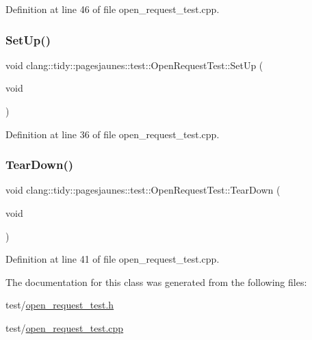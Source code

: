 Definition at line 46 of file open\+\_\+request\+\_\+test.\+cpp.

\mbox{\label{classclang_1_1tidy_1_1pagesjaunes_1_1test_1_1_open_request_test_a45a010812dff31c9170dd04adfda2202}} 
\subsubsection{\texorpdfstring{Set\+Up()}{SetUp()}}
{\footnotesize\ttfamily void clang\+::tidy\+::pagesjaunes\+::test\+::\+Open\+Request\+Test\+::\+Set\+Up (\begin{DoxyParamCaption}\item[{void}]{ }\end{DoxyParamCaption})\hspace{0.3cm}{\ttfamily [virtual]}}



Definition at line 36 of file open\+\_\+request\+\_\+test.\+cpp.

\mbox{\label{classclang_1_1tidy_1_1pagesjaunes_1_1test_1_1_open_request_test_a5c9237258553286289ddc7e71016a60f}} 
\subsubsection{\texorpdfstring{Tear\+Down()}{TearDown()}}
{\footnotesize\ttfamily void clang\+::tidy\+::pagesjaunes\+::test\+::\+Open\+Request\+Test\+::\+Tear\+Down (\begin{DoxyParamCaption}\item[{void}]{ }\end{DoxyParamCaption})\hspace{0.3cm}{\ttfamily [virtual]}}



Definition at line 41 of file open\+\_\+request\+\_\+test.\+cpp.



The documentation for this class was generated from the following files\+:\begin{DoxyCompactItemize}
\item 
test/\hyperlink{open__request__test_8h}{open\+\_\+request\+\_\+test.\+h}\item 
test/\hyperlink{open__request__test_8cpp}{open\+\_\+request\+\_\+test.\+cpp}\end{DoxyCompactItemize}
